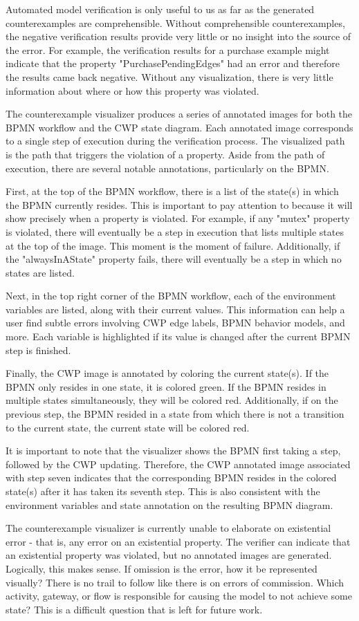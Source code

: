 Automated model verification is only useful to us as far as the generated counterexamples are comprehensible. Without comprehensible counterexamples, the negative verification results provide very little or no insight into the source of the error. For example, the verification results for a purchase example might indicate that the property "PurchasePendingEdges" had an error and therefore the results came back negative. Without any visualization, there is very little information about where or how this property was violated.

The counterexample visualizer produces a series of annotated images for both the BPMN workflow and the CWP state diagram. Each annotated image corresponds to a single step of execution during the verification process. The visualized path is the path that triggers the violation of a property. Aside from the path of execution, there are several notable annotations, particularly on the BPMN.

First, at the top of the BPMN workflow, there is a list of the state(s) in which the BPMN currently resides. This is important to pay attention to because it will show precisely when a property is violated. For example, if any "mutex" property is violated, there will eventually be a step in execution that lists multiple states at the top of the image. This moment is the moment of failure. Additionally, if the "alwaysInAState" property fails, there will eventually be a step in which no states are listed.

Next, in the top right corner of the BPMN workflow, each of the environment variables are listed, along with their current values. This information can help a user find subtle errors involving CWP edge labels, BPMN behavior models, and more. Each variable is highlighted if its value is changed after the current BPMN step is finished.

Finally, the CWP image is annotated by coloring the current state(s). If the BPMN only resides in one state, it is colored green. If the BPMN resides in multiple states simultaneously, they will be colored red. Additionally, if on the previous step, the BPMN resided in a state from which there is not a transition to the current state, the current state will be colored red.

It is important to note that the visualizer shows the BPMN first taking a step, followed by the CWP updating. Therefore, the CWP annotated image associated with step seven indicates that the corresponding BPMN resides in the colored state(s) after it has taken its seventh step. This is also consistent with the environment variables and state annotation on the resulting BPMN diagram.

The counterexample visualizer is currently unable to elaborate on existential error - that is, any error on an existential property. The verifier can indicate that an existential property was violated, but no annotated images are generated. Logically, this makes sense. If omission is the error, how it be represented visually? There is no trail to follow like there is on errors of commission. Which activity, gateway, or flow is responsible for causing the model to not achieve some state? This is a difficult question that is left for future work.

